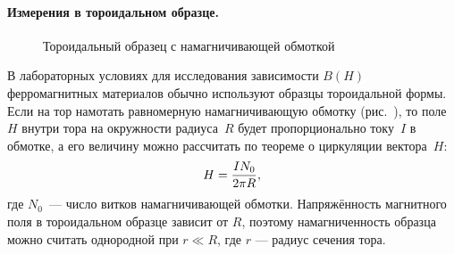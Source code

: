 

\paragraph{Измерения в тороидальном образце.}

\begin{wrapfigure}[13]{r}{0.4\textwidth}
    \caption{Тороидальный образец с намагничивающей обмоткой}
\end{wrapfigure}

В лабораторных условиях для исследования зависимости $B(H)$ ферромагнитных
материалов обычно используют образцы тороидальной формы. Если на тор намотать
равномерную намагничивающую обмотку (рис.~), то поле~$H$ внутри
тора на окружности радиуса~$R$ будет пропорционально току~$I$ в обмотке, а его
величину можно рассчитать по теореме о циркуляции вектора~$H$:
\begin{equation}
    \eqmark{H-toroid}
    H = \frac{IN_0}{2\pi R},
\end{equation}
где $N_0$~--- число витков намагничивающей обмотки. Напряжённость магнитного
поля в тороидальном образце зависит от $R$, поэтому
намагниченность образца можно считать однородной при $r \ll R$, где $r$ ---
радиус сечения тора.

